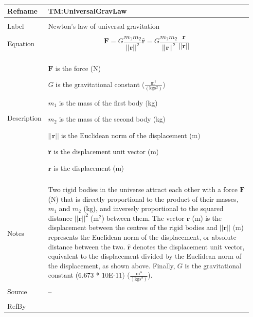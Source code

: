 \documentclass[12pt]{article}
\begin{document}
\noindent \begin{minipage}{\textwidth}
\begin{tabular}{>{\raggedright}p{}>{\raggedright\arraybackslash}p{}}
\toprule \textbf{Refname} & \textbf{TM:UniversalGravLaw}
\label{TM:UniversalGravLaw}
\\ \midrule \\
Label & Newton's law of universal gravitation
\\ \midrule \\
Equation & \begin{displaymath}
           \mathbf{F}=G \frac{{m_{1}} {m_{2}}}{||\mathbf{r}||^{2}} \mathbf{\hat{r}}=G \frac{{m_{1}} {m_{2}}}{||\mathbf{r}||^{2}} \frac{\mathbf{r}}{||\mathbf{r}||}
           \end{displaymath}
\\ \midrule \\
Description & \begin{symbDescription}
              \item{$\mathbf{F}$ is the force (N)}
              \item{$G$ is the gravitational constant ($\frac{\text{m}^{3}}{(\text{kg}\text{s}^{2})}$)}
              \item{${m_{1}}$ is the mass of the first body (kg)}
              \item{${m_{2}}$ is the mass of the second body (kg)}
              \item{$||\mathbf{r}||$ is the Euclidean norm of the displacement (m)}
              \item{$\mathbf{\hat{r}}$ is the displacement unit vector (m)}
              \item{$\mathbf{r}$ is the displacement (m)}
              \end{symbDescription}
\\ \midrule \\
Notes & Two rigid bodies in the universe attract each other with a force $\mathbf{F}$ (N) that is directly proportional to the product of their masses, ${m_{1}}$ and ${m_{2}}$ (kg), and inversely proportional to the squared distance ${||\mathbf{r}||^{2}}$ ($\text{m}^{2}$) between them. The vector $\mathbf{r}$ (m) is the displacement between the centres of the rigid bodies and $||\mathbf{r}||$ (m) represents the Euclidean norm of the displacement, or absolute distance between the two. $\mathbf{\hat{r}}$ denotes the displacement unit vector, equivalent to the displacement divided by the Euclidean norm of the displacement, as shown above. Finally, $G$ is the gravitational constant (6.673 * 10E-11) ($\frac{\text{m}^{3}}{(\text{kg}\text{s}^{2})}$).
\\ \midrule \\
Source & --
\\ \midrule \\
RefBy & 
\\ \bottomrule
\end{tabular}
\end{minipage}
\par~
\end{document}
